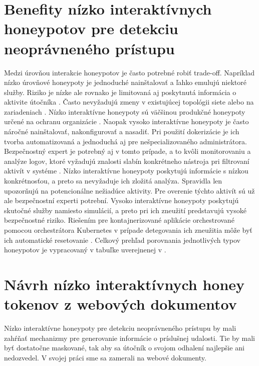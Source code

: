 \documentclass[conference, 11pt,slovak,a4paper,twoside]{IEEEtran}
\begin{document}
\section{Benefity nízko interaktívnych honeypotov pre detekciu neoprávneného prístupu} \label{benefitsOfLowInteractionHoneyTokens}

Medzi úrovňou interakcie honeypotov je často potrebné robiť trade-off. Napríklad nízko úrovňové honeypoty je jednoduché nainštalovať a ľahko emulujú niektoré služby. Riziko je nízke ale rovnako je limitovaná aj poskytnutá informácia o aktivite útočníka \cite{spitzner_honeypots_2002}. Často nevyžadujú zmeny v existujúcej topológii siete alebo na zariadeniach \cite{scada_2014}. Nízko interaktívne honeypoty sú väčšinou produkčné honeypoty určené na ochranu organizácie \cite{spitzner_honeypots_2002}. Naopak vysoko interaktívne honeypoty je často náročné nainštalovať, nakonfigurovať a nasadiť. Pri použití dokerizácie je ich tvorba automatizovaná a jednoduchá aj pre nešpecializovaného administrátora. Bezpečnostný expert je potrebný aj v tomto prípade, a to kvôli monitorovaniu a analýze logov, ktoré vyžadujú znalosti slabín konkrétneho nástroja pri filtrovaní aktivít v systéme \cite{valicek_creation_2017}. Nízko interaktívne honeypoty poskytujú informácie s nízkou konkrétnosťou, a preto sa nevyžaduje ich zložitá analýza. Spravidla len upozorňujú na potencionálne nežiadúce aktivity. Pre overenie týchto aktivít sú už ale bezpečnostní experti potrební. Vysoko interaktívne honeypoty poskytujú skutočné služby namiesto simulácií, a preto pri ich zneužití predstavujú vysoké bezpečnostné riziko. Riešením pre kontajnerizované aplikácie orchestrované pomocou orchestrátora Kubernetes v prípade detegovania ich zneužitia môže byť ich automatické resetovanie \cite{reti_escape_2021}. Celkový prehľad porovnania jednotlivých typov honeypotov je vypracovaný v tabuľke uverejnenej v \cite{nagpal_catch_2015}. 



\section{Návrh nízko interaktívnych honey tokenov z webových dokumentov} \label{designOfLowInteractiveHoneyToken}

Nízko interaktívne honeypoty pre detekciu neoprávneného prístupu by mali zahŕňať mechanizmy pre generovanie informácie o príslušnej udalosti. Tie by mali byť dostatočne maskované, tak aby sa útočník o svojom odhalení najlepšie ani nedozvedel. V svojej práci sme sa zamerali na webové dokumenty. 
\end{document}

